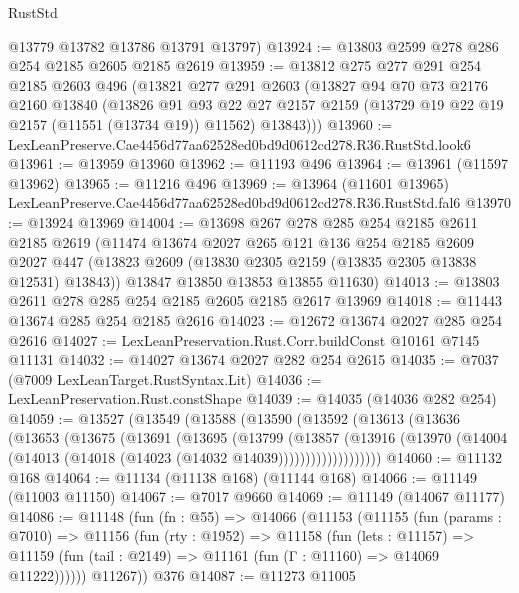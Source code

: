 \begin{lexlean}{RustStd}
\begin{coremodule}
      @13779
      @13782
      @13786
      @13791
      @13797)
@13924 := @13803 @2599 @278 @286 @254 @2185 @2605 @2185 @2619
@13959 := @13812
    @275
    @277
    @291
    @254
    @2185
    @2603
    @496
    (@13821
      @277
      @291
      @2603
      (@13827
        @94
        @70
        @73
        @2176
        @2160
        @13840
        (@13826
          @91
          @93
          @22
          @27
          @2157
          @2159
          (@13729 @19 @22 @19 @2157 (@11551 (@13734 @19)) @11562)
          @13843)))
@13960 := LexLeanPreserve.Cae4456d77aa62528ed0bd9d0612cd278.R36.RustStd.look6
@13961 := @13959 @13960
@13962 := @11193 @496
@13964 := @13961 (@11597 @13962)
@13965 := @11216 @496
@13969 := @13964 (@11601 @13965) LexLeanPreserve.Cae4456d77aa62528ed0bd9d0612cd278.R36.RustStd.fal6
@13970 := @13924 @13969
@14004 := @13698
    @267
    @278
    @285
    @254
    @2185
    @2611
    @2185
    @2619
    (@11474
      @13674
      @2027
      @265
      @121
      @136
      @254
      @2185
      @2609
      @2027
      @447
      (@13823 @2609 (@13830 @2305 @2159 (@13835 @2305 @13838 @12531) @13843))
      @13847
      @13850
      @13853
      @13855
      @11630)
@14013 := @13803 @2611 @278 @285 @254 @2185 @2605 @2185 @2617 @13969
@14018 := @11443 @13674 @285 @254 @2185 @2616
@14023 := @12672 @13674 @2027 @285 @254 @2616
@14027 := LexLeanPreservation.Rust.Corr.buildConst @10161 @7145 @11131
@14032 := @14027 @13674 @2027 @282 @254 @2615
@14035 := @7037 (@7009 LexLeanTarget.RustSyntax.Lit)
@14036 := LexLeanPreservation.Rust.constShape
@14039 := @14035 (@14036 @282 @254)
@14059 := @13527
    (@13549
      (@13588
        (@13590
          (@13592
            (@13613
              (@13636
                (@13653
                  (@13675
                    (@13691
                      (@13695
                        (@13799
                          (@13857
                            (@13916
                              (@13970
                                (@14004 (@14013 (@14018 (@14023 (@14032 @14039)))))))))))))))))))
@14060 := @11132 @168
@14064 := @11134 (@11138 @168) (@11144 @168)
@14066 := @11149 (@11003 @11150)
@14067 := @7017 @9660
@14069 := @11149 (@14067 @11177)
@14086 := @11148
    (fun (fn : @55) =>
    @14066
      (@11153
        (@11155
          (fun (params : @7010) =>
          @11156
            (fun (rty : @1952) =>
            @11158
              (fun (lets : @11157) =>
              @11159 (fun (tail : @2149) => @11161 (fun (Γ : @11160) => @14069 @11222))))))
        @11267))
    @376
@14087 := @11273 @11005

\end{coremodule}
\end{lexlean}
